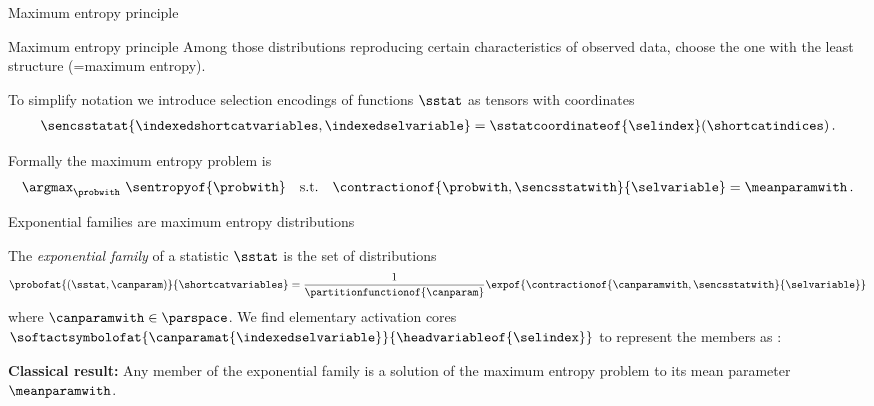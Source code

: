 \documentclass{beamer}
\begin{document}
    \begin{frame}{Maximum entropy principle}


        \begin{block}{Maximum entropy principle}
            Among those distributions reproducing certain characteristics of observed data, choose the one with the least structure (=maximum entropy).
        \end{block}


        To simplify notation we introduce selection encodings of functions $\sstat$ as tensors with coordinates
        \begin{align*}
            \sencsstatat{\indexedshortcatvariables,\indexedselvariable}
            = \sstatcoordinateof{\selindex}(\shortcatindices) \, .
        \end{align*}

        Formally the maximum entropy problem is
        \begin{align*}
            \argmax_{\probwith} \,\,\sentropyof{\probwith}
            \quad\text{s.t.}\quad
            \contractionof{\probwith,\sencsstatwith}{\selvariable} = \meanparamwith \, .
        \end{align*}


    \end{frame}


    \begin{frame}{Exponential families are maximum entropy distributions}

        The \emph{exponential family} of a statistic $\sstat$ is the set of distributions
        \begin{align*}
            \probofat{(\sstat,\canparam)}{\shortcatvariables}
            = \frac{1}{\partitionfunctionof{\canparam}} \expof{\contractionof{\canparamwith,\sencsstatwith}{\selvariable}}
        \end{align*}
        where $\canparamwith\in\parspace$.
        We find elementary activation cores $\softactsymbolofat{\canparamat{\indexedselvariable}}{\headvariableof{\selindex}}$ to represent the members as \CompActNets{}:
        \begin{center}
            
        \end{center}
            {\bf Classical result:}
        Any member of the exponential family is a solution of the maximum entropy problem to its mean parameter $\meanparamwith$.

    \end{frame}
\end{document}
